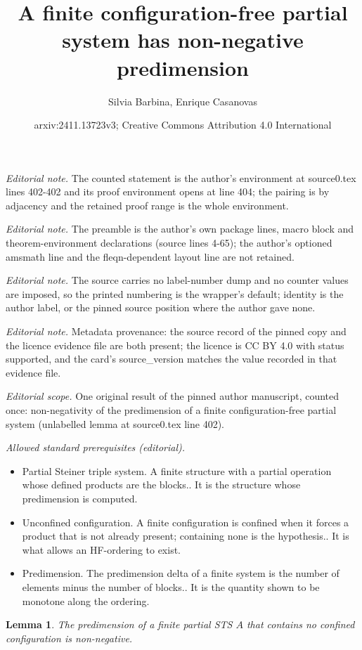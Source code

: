 \documentclass[10pt,a4paper]{article}
\title{A finite configuration-free partial system has non-negative predimension}
\author{Silvia Barbina, Enrique Casanovas}
\date{arxiv:2411.13723v3; Creative Commons Attribution 4.0 International}
\theoremstyle{note}
\newtheorem{lemma}[thm]{Lemma}
\begin{document}
\maketitle
\noindent\textit{Editorial note.} The counted statement is the author's environment at source0.tex lines 402-402 and its proof environment opens at line 404; the pairing is by adjacency and the retained proof range is the whole environment.\par\medskip
\noindent\textit{Editorial note.} The preamble is the author's own package lines, macro block and theorem-environment declarations (source lines 4-65); the author's optioned amsmath line and the fleqn-dependent layout line are not retained.\par\medskip
\noindent\textit{Editorial note.} The source carries no label-number dump and no counter values are imposed, so the printed numbering is the wrapper's default; identity is the author label, or the pinned source position where the author gave none.\par\medskip
\noindent\textit{Editorial note.} Metadata provenance: the source record of the pinned copy and the licence evidence file are both present; the licence is CC BY 4.0 with status supported, and the card's source\_version matches the value recorded in that evidence file.\par\medskip
\noindent\textit{Editorial scope.} One original result of the pinned author manuscript, counted once: non-negativity of the predimension of a finite configuration-free partial system (unlabelled lemma at source0.tex line 402).\par\medskip
\noindent\textit{Allowed standard prerequisites (editorial).}\begin{itemize}
\item Partial Steiner triple system. A finite structure with a partial operation whose defined products are the blocks.. It is the structure whose predimension is computed.
\item Unconfined configuration. A finite configuration is confined when it forces a product that is not already present; containing none is the hypothesis.. It is what allows an HF-ordering to exist.
\item Predimension. The predimension delta of a finite system is the number of elements minus the number of blocks.. It is the quantity shown to be monotone along the ordering.
\end{itemize}\medskip
\begin{lemma} The predimension of a finite partial STS $A$ that contains no confined configuration is non-negative. \end{lemma}
\end{document}
